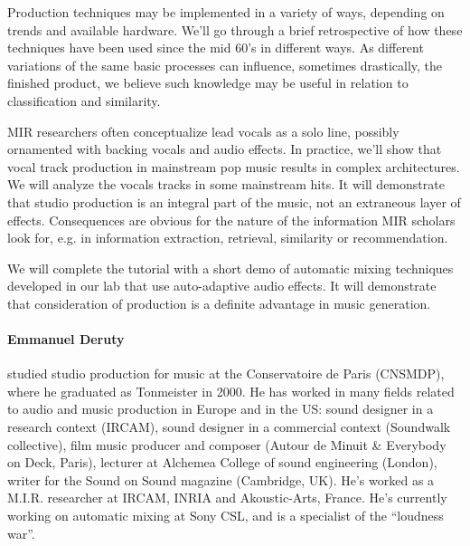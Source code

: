 {Production techniques may be implemented in a variety of ways, depending on trends and available hardware. We’ll go through a brief retrospective of how these techniques have been used since the mid 60’s in different ways. As different variations of the same basic processes can influence, sometimes drastically, the finished product, we believe such knowledge may be useful in relation to classification and similarity.

MIR researchers often conceptualize lead vocals as a solo line, possibly ornamented with backing vocals and audio effects. In practice, we’ll show that vocal track production in mainstream pop music results in complex architectures. We will analyze the vocals tracks in some mainstream hits. It will demonstrate that studio production is an integral part of the music, not an extraneous layer of effects. Consequences are obvious for the nature of the information MIR scholars look for, e.g. in information extraction, retrieval, similarity or recommendation.

We will complete the tutorial with a short demo of automatic mixing techniques developed in our lab that use auto-adaptive audio effects. It will demonstrate that consideration of production is a definite advantage in music generation.}{\paragraph{Emmanuel Deruty} studied studio production for music at the Conservatoire de Paris (CNSMDP), where he graduated as Tonmeister in 2000. He has worked in many fields related to audio and music production in Europe and in the US: sound designer in a research context (IRCAM), sound designer in a commercial context (Soundwalk collective), film music producer and composer (Autour de Minuit \& Everybody on Deck, Paris), lecturer at Alchemea College of sound engineering (London), writer for the Sound on Sound magazine (Cambridge, UK). He’s worked as a M.I.R. researcher at IRCAM, INRIA and Akoustic-Arts, France. He’s currently working on automatic mixing at Sony CSL, and is a specialist of the “loudness war”.

}

